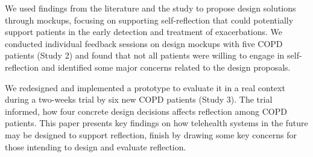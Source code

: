 We used findings from the literature and the study to propose design solutions through mockups, focusing on supporting self-reflection that could potentially support patients in the early detection and treatment of exacerbations. We conducted individual feedback sessions on design mockups with five COPD patients (Study 2) and found that not all patients were willing to engage in self-reflection and identified some major concerns related to the design proposals. 

We redesigned and implemented a prototype to evaluate it in a real context during a two-weeks trial by six new COPD patients (Study 3). The trial informed, how four concrete design decisions affects reflection among COPD patients. This paper presents key findings on how telehealth systems in the future may be designed to support reflection, finish by drawing some key concerns for those intending to design and evaluate reflection. 